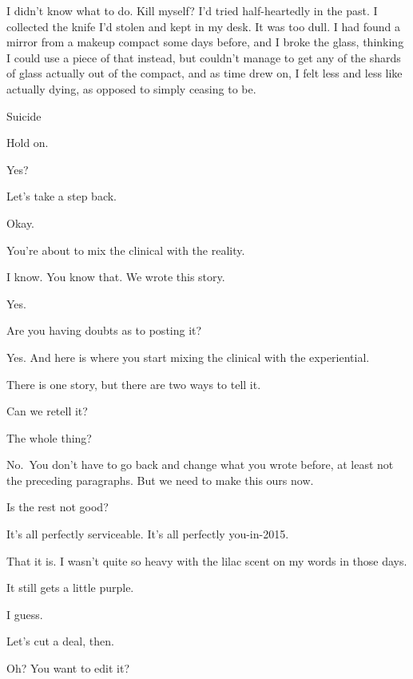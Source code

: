 \begin{paracol}{2}
\begin{leftcolumn}
I didn't know what to do. Kill myself? I'd tried half-heartedly in the past. I collected the knife I'd stolen and kept in my desk. It was too dull. I had found a mirror from a makeup compact some days before, and I broke the glass, thinking I could use a piece of that instead, but couldn't manage to get any of the shards of glass actually out of the compact, and as time drew on, I felt less and less like actually dying, as opposed to simply ceasing to be.
\newpage

Suicide

\begin{ally}
Hold on.
\end{ally}
Yes?

\begin{ally}
Let's take a step back.
\end{ally}
Okay.

\begin{ally}
You're about to mix the clinical with the reality.
\end{ally}
I know. You know that. We wrote this story.

\begin{ally}
Yes.
\end{ally}
Are you having doubts as to posting it?

\begin{ally}
Yes. And here is where you start mixing the clinical with the experiential.
\end{ally}
There is one story, but there are two ways to tell it.

\begin{ally}
Can we retell it?
\end{ally}
The whole thing?

\begin{ally}
No.~You don't have to go back and change what you wrote before, at least not the preceding paragraphs. But we need to make this ours now.
\end{ally}
Is the rest not good?

\begin{ally}
It's all perfectly serviceable. It's all perfectly you-in-2015.
\end{ally}
That it is. I wasn't quite so heavy with the lilac scent on my words in those days.

\begin{ally}
It still gets a little purple.
\end{ally}
I guess.

\begin{ally}
Let's cut a deal, then.
\end{ally}
Oh? You want to edit it?


\end{leftcolumn}
\end{paracol}
